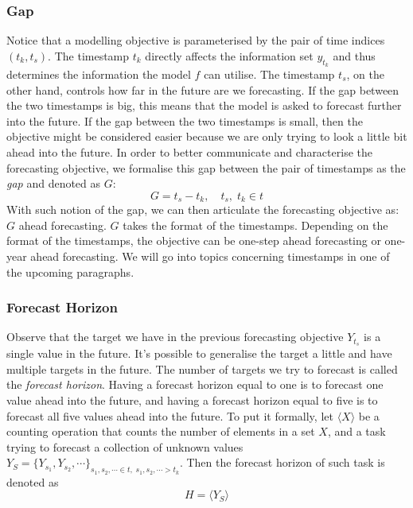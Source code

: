 \subsubsection{Gap}
Notice that a modelling objective is parameterised by the pair of time indices $(t_k, t_s)$. The timestamp $t_k$ directly affects the information set $y_{t_k}$ and thus determines the information the model $f$ can utilise. The timestamp $t_s$, on the other hand, controls how far in the future are we forecasting. If the gap between the two timestamps is big, this means that the model is asked to forecast further into the future. If the gap between the two timestamps is small, then the objective might be considered easier because we are only trying to look a little bit ahead into the future. In order to better communicate and characterise the forecasting objective, we formalise this gap between the pair of timestamps as the \textit{gap} and denoted as $G$:
\begin{equation*}
    G = t_s - t_k, \quad t_s, \; t_k \in t
\end{equation*}
With such notion of the gap, we can then articulate the forecasting objective as: $G$ ahead forecasting. $G$ takes the format of the timestamps. Depending on the format of the timestamps, the objective can be one-step ahead forecasting or one-year ahead forecasting. We will go into topics concerning timestamps in one of the upcoming paragraphs.

\subsubsection{Forecast Horizon}
Observe that the target we have in the previous forecasting objective $Y_{t_s}$ is a single value in the future. It's possible to generalise the target a little and have multiple targets in the future. The number of targets we try to forecast is called the \textit{forecast horizon}. Having a forecast horizon equal to one is to forecast one value ahead into the future, and having a forecast horizon equal to five is to forecast all five values ahead into the future. To put it formally, let $\langle X \rangle$ be a counting operation that counts the number of elements in a set $X$, and a task trying to forecast a collection of unknown values $Y_S = \{ Y_{s_1}, Y_{s_2}, \cdots \}_{s_1, s_2, \cdots \in t, \; s_1, s_2, \cdots > t_k}$. Then the forecast horizon of such task is denoted as
\begin{equation*}
    H = \langle Y_S \rangle
\end{equation*}

